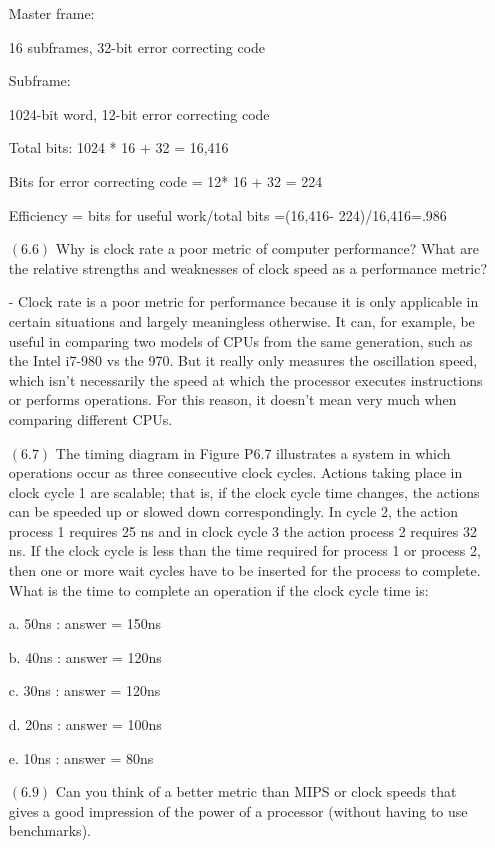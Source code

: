 \documentclass[letterpaper,10pt,titlepage]{article}
\begin{document}
\begin{enumerate}
Master frame:

16 subframes, 32-bit error correcting code

Subframe:

1024-bit word, 12-bit error correcting code

Total bits: 1024 * 16 + 32 = 16,416

Bits for error correcting code = 12* 16 + 32 = 224

Efficiency = bits for useful work/total bits =(16,416- 224)/16,416=.986


\item[$(6.6)$] Why is clock rate a poor metric of computer performance? What are the relative strengths and weaknesses of clock speed as a performance metric?

- Clock rate is a poor metric for performance because it is only applicable in certain situations and largely meaningless otherwise. It can, for example, be useful in comparing two models of CPUs from the same generation, such as the Intel i7-980 vs the 970. But it really only measures the oscillation speed, which isn’t necessarily the speed at which the processor executes instructions or performs operations. For this reason, it doesn’t mean very much when comparing different CPUs.


\item[$(6.7)$]The timing diagram in Figure P6.7 illustrates a system in which operations occur as three consecutive clock cycles. Actions taking place in clock cycle 1 are scalable; that is, if the clock cycle time changes, the actions can be speeded up or slowed down correspondingly. In cycle 2, the action process 1 requires 25 ns and in clock cycle 3 the action process 2 requires 32 ns. If the clock cycle is less than the time required for process 1 or process 2, then one or more wait cycles have to be inserted for the process to complete. What is the time to complete an operation if the clock cycle time is:

a. 50ns : answer = 150ns

b. 40ns : answer = 120ns

c. 30ns : answer = 120ns

d. 20ns : answer = 100ns

e. 10ns : answer = 80ns


\item[$(6.9)$] Can you think of a better metric than MIPS or clock speeds that gives a good impression of the power of a processor (without having to use benchmarks).


\end{enumerate}
\end{document}
